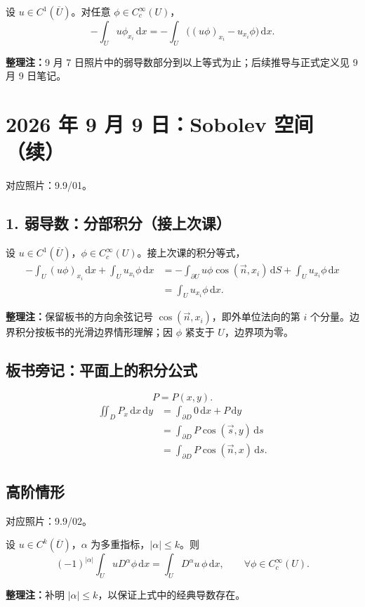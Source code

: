 \documentclass[UTF8,a4paper,11pt,fontset=fandol]{ctexart}
\newcommand{\dd}{\,\mathrm d}
\newcommand{\Ub}{\overline U}
\newcommand{\ednote}[1]{\par{\small\color{notegray}\textbf{整理注：}#1}\par}
\newcommand{\source}[1]{{\small\color{notegray}对应照片：#1。}\par}
\begin{document}
设 $u\in C^1(\Ub)$。对任意 $\phi\in C_c^\infty(U)$，
\[
-\int_Uu\phi_{x_i}\dd x
=-\int_U\bigl((u\phi)_{x_i}-u_{x_i}\phi\bigr)\dd x.
\]
\ednote{9 月 7 日照片中的弱导数部分到以上等式为止；后续推导与正式定义见 9 月 9 日笔记。}

\clearpage
{}
\section*{2026 年 9 月 9 日：Sobolev 空间（续）}
\source{9.9/01}
\subsection*{1. 弱导数：分部积分（接上次课）}
设 $u\in C^1(\Ub)$，$\phi\in C_c^\infty(U)$。接上次课的积分等式，
\[
\begin{aligned}
-\int_U(u\phi)_{x_i}\dd x+\int_Uu_{x_i}\phi\dd x
&=-\int_{\partial U}u\phi\cos(\vec n,x_i)\dd S
  +\int_Uu_{x_i}\phi\dd x\\
&=\int_Uu_{x_i}\phi\dd x.
\end{aligned}
\]
\ednote{保留板书的方向余弦记号 $\cos(\vec n,x_i)$，即外单位法向的第 $i$ 个分量。边界积分按板书的光滑边界情形理解；因 $\phi$ 紧支于 $U$，边界项为零。}

\subsection*{板书旁记：平面上的积分公式}
\[
P=P(x,y).
\]
\[
\begin{aligned}
\iint_D P_x\dd x\dd y
&=\int_{\partial D}0\dd x+P\dd y\\
&=\int_{\partial D}P\cos(\vec s,y)\dd s\\
&=\int_{\partial D}P\cos(\vec n,x)\dd s.
\end{aligned}
\]
\begin{center}
\end{center}

\subsection*{高阶情形}
\source{9.9/02}
设 $u\in C^k(\Ub)$，$\alpha$ 为多重指标，$|\alpha|\leq k$。则
\[
(-1)^{|\alpha|}\int_UuD^\alpha\phi\dd x
=\int_UD^\alpha u\,\phi\dd x,
\qquad\forall\phi\in C_c^\infty(U).
\]
\ednote{补明 $|\alpha|\leq k$，以保证上式中的经典导数存在。}
\end{document}
